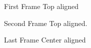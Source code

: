 \documentclass{beamer}
\begin{document}
  \begin{frame}{First Frame}
     Top aligned
  \end{frame}

  \begin{frame}{Second Frame}
      Top aligned.
  \end{frame}

  \begin{frame}{Last Frame}
     Center aligned
  \end{frame}

 
\end{document}
